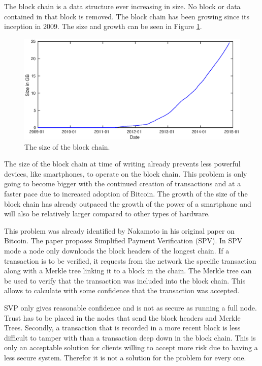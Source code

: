 The block chain is a data structure ever increasing in size.
No block or data contained in that block is removed.
The block chain has been growing since its inception in 2009.
The size and growth can be seen in Figure \ref{fig:bc-size}.

\begin{figure}
        \centerline{\includegraphics[scale=0.6]{relatedWork/figs/blockchainsize/blockchainsize.eps}}
        \caption{The size of the block chain.~\cite{Blockchain.info-bcs}}
	\label{fig:bc-size}
\end{figure}

The size of the block chain at time of writing already prevents less powerful devices, like smartphones,
to operate on the block chain.
This problem is only going to become bigger with the continued creation of transactions
and at a faster pace due to increased adoption of Bitcoin.
The growth of the size of the block chain has already outpaced the growth of the power of a smartphone
and will also be relatively larger compared to other types of hardware.

This problem was already identified by Nakamoto in his original paper on Bitcoin.
The paper proposes Simplified Payment Verification (SPV).
In SPV mode a node only downloads the block headers of the longest chain.
If a transaction is to be verified, it requests from the network the specific transaction
along with a Merkle tree linking it to a block in the chain.
The Merkle tree can be used to verify that the transaction was included into the block chain.
This allows to calculate with some confidence that the transaction was accepted.

SVP only gives reasonable confidence and is not as secure as running a full node.
Trust has to be placed in the nodes that send the block headers and Merkle Trees.
Secondly, a transaction that is recorded in a more recent block is less difficult to tamper with
than a transaction deep down in the block chain.
This is only an acceptable solution for clients willing to accept more risk due to having a less secure system.
Therefor it is not a solution for the problem for every one.

